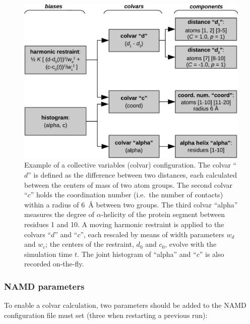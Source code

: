 \begin{figure}[!ht]
  \centering
  \includegraphics[width=12cm]{figures/colvars_diagram}
  \caption{Example of a collective variables (colvar) configuration.
    The colvar ``$d$'' is defined as the difference between two
    distances, each calculated between the centers of mass of two
    atom groups.  The second colvar ``$c$'' holds the coordination
    number (i.e.~the number of contacts) within a radius of 6~\AA{}
    between two groups.  The third colvar ``alpha'' measures the
    degree of $\alpha$-helicity of the protein segment between
    residues 1 and 10. A moving harmonic restraint is applied to the
    colvars ``$d$'' and ``$c$'', each rescaled by means of width
    parameters $w_{d}$ and $w_{c}$; the centers of the restraint,
    $d_0$ and $c_0$, evolve with the simulation time $t$. The joint
    histogram of ``alpha'' and ``$c$'' is also recorded on-the-fly.}
  \label{fig:colvars_diagram}
\end{figure}


\subsubsection{NAMD parameters}

To enable a colvar calculation, two parameters should be added to the
NAMD configuration file must set (three when restarting a previous
run):


